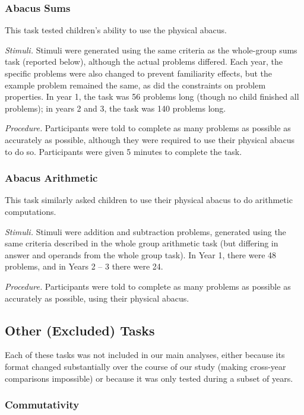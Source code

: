 \documentclass[11pt]{article}
\begin{document}
\subsubsection{Abacus Sums}

This task tested children's ability to use the physical abacus.

{\it Stimuli.} Stimuli were generated using the same criteria as the whole-group sums task (reported below), although the actual problems differed. Each year, the specific problems were also changed to prevent familiarity effects, but the example problem remained the same, as did the constraints on problem properties. In year 1, the task was 56 problems long (though no child finished all problems); in years 2 and 3, the task was 140 problems long.

{\it Procedure.} Participants were told to complete as many problems as possible as accurately as possible, although they were required to use their physical abacus to do so. Participants were given 5 minutes to complete the task.

\subsubsection{Abacus Arithmetic}

This task similarly asked children to use their physical abacus to do arithmetic computations.

{\it Stimuli.} Stimuli were addition and subtraction problems, generated using the same criteria described in the whole group arithmetic task (but differing in answer and operands from the whole group task). In Year 1, there were 48 problems, and in Years 2 -- 3 there were 24.

{\it Procedure.} Participants were told to complete as many problems as possible as accurately as possible, using their physical abacus.

\subsection{Other (Excluded) Tasks}

Each of these tasks was not included in our main analyses, either because its format changed substantially over the course of our study (making cross-year comparisons impossible) or because it was only tested during a subset of years.

\subsubsection{Commutativity}
\end{document}
